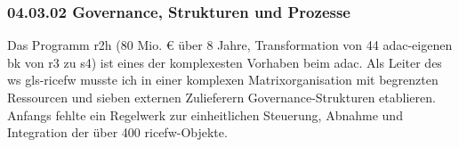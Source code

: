 \subsubsection*{04.03.02	Governance, Strukturen und Prozesse} 
{}
 \label{sec:04.03.02.GovernanceStrukturenundProzesse}

\par Das Programm \gls{r2h} (80 Mio. € über 8 Jahre, Transformation von 44 \gls{adac}-eigenen \gls{bk} von \gls{r3} zu \gls{s4}) ist eines der komplexesten Vorhaben beim \gls{adac}. Als Leiter des \gls{ws} \gls{gls-ricefw} musste ich in einer komplexen Matrixorganisation mit begrenzten Ressourcen und sieben externen Zulieferern Governance-Strukturen etablieren. Anfangs fehlte ein Regelwerk zur einheitlichen Steuerung, Abnahme und Integration der über 400 \gls{ricefw}-Objekte.
